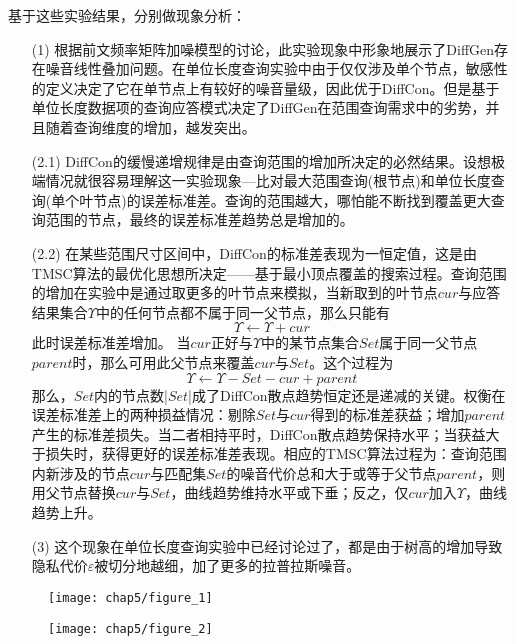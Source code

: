 基于这些实验结果，分别做现象分析：
\begin{enumerate}
	\item[(1)]根据前文频率矩阵加噪模型的讨论，此实验现象中形象地展示了DiffGen存在噪音线性叠加问题。在单位长度查询实验中由于仅仅涉及单个节点，敏感性的定义决定了它在单节点上有较好的噪音量级，因此优于DiffCon。但是基于单位长度数据项的查询应答模式决定了DiffGen在范围查询需求中的劣势，并且随着查询维度的增加，越发突出。
	\item[(2.1)]DiffCon的缓慢递增规律是由查询范围的增加所决定的必然结果。设想极端情况就很容易理解这一实验现象---比对最大范围查询(根节点)和单位长度查询(单个叶节点)的误差标准差。查询的范围越大，哪怕能不断找到覆盖更大查询范围的节点，最终的误差标准差趋势总是增加的。
	\item[(2.2)]在某些范围尺寸区间中，DiffCon的标准差表现为一恒定值，这是由TMSC算法的最优化思想所决定——基于最小顶点覆盖的搜索过程。查询范围的增加在实验中是通过取更多的叶节点来模拟，当新取到的叶节点$cur$与应答结果集合$\Upsilon$中的任何节点都不属于同一父节点，那么只能有
	\[
	\Upsilon \leftarrow \Upsilon + cur
	\]
	此时误差标准差增加。
	当$cur$正好与$\Upsilon$中的某节点集合$Set$属于同一父节点$parent$时，那么可用此父节点来覆盖$cur$与$Set$。这个过程为
	\[
	\Upsilon \leftarrow \Upsilon - Set - cur + parent
	\]
	那么，$Set$内的节点数|$Set$|成了DiffCon散点趋势恒定还是递减的关键。权衡在误差标准差上的两种损益情况：剔除$Set$与$cur$得到的标准差获益；增加$parent$产生的标准差损失。当二者相持平时，DiffCon散点趋势保持水平；当获益大于损失时，获得更好的误差标准差表现。相应的TMSC算法过程为：查询范围内新涉及的节点$cur$与匹配集$Set$的噪音代价总和大于或等于父节点$parent$，则用父节点替换$cur$与$Set$，曲线趋势维持水平或下垂；反之，仅$cur$加入$\Upsilon$，曲线趋势上升。
	\item[(3)]这个现象在单位长度查询实验中已经讨论过了，都是由于树高的增加导致隐私代价$\varepsilon$被切分地越细，加了更多的拉普拉斯噪音。
\end{enumerate}

\begin{figure}[!htp]
	\centering
	\texttt{[image: chap5/figure\_1]}
\end{figure}

\begin{figure}[!htp]
	\centering
	\texttt{[image: chap5/figure\_2]}
\end{figure}

